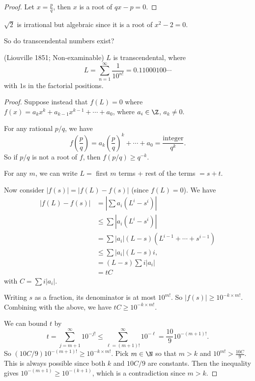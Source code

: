 \documentclass[a4paper]{article}
\begin{document}
  \begin{proof}
    Let $x = \frac{p}{q}$, then $x$ is a root of $qx - p = 0$.
  \end{proof}

  \begin{eg}
    $\sqrt{2}$ is irrational but algebraic since it is a root of $x^2 - 2 = 0$.
  \end{eg}

  So do transcendental numbers exist?
  \begin{thm}
    (Liouville 1851; Non-examinable) $L$ is transcendental, where
    \[
      L = \sum_{n = 1}^\infty \frac{1}{10^{n!}} = 0.11000100\cdots
    \]
    with $1$s in the factorial positions.
  \end{thm}

  \begin{proof}
    Suppose instead that $f(L) = 0$ where $f(x) = a_kx^k + a_{k -1}x^{k - 1} + \cdots + a_0$, where $a_i\in \Z$, $a_k\not= 0$.

    For any rational $p/q$, we have
    \[
      f\left(\frac{p}{q}\right) = a_k\left(\frac{p}{q}\right)^k + \cdots + a_0 = \frac{\text{integer}}{q^k}.
    \]
    So if $p/q$ is not a root of $f$, then $f(p/q) \geq q^{-k}$.

    For any $m$, we can write $L = $ first $m$ terms + rest of the terms $ = s + t$.

    Now consider $|f(s)| = |f(L) - f(s)|$ (since $f(L) = 0$). We have
    \begin{align*}
      |f(L) - f(s)| &= \left|\sum a_i(L^i - s^i)\right|\\
      &\leq \sum |a_i(L^i - s^i)|\\
      &= \sum |a_i|(L - s)(L^{i - 1} + \cdots + s^{i - 1})\\
      &\leq \sum |a_i|(L - s)i,\\
      &= (L - s)\sum i|a_i|\\
      &= tC
    \end{align*}
    with $C = \sum i|a_i|$.

    Writing $s$ as a fraction, its denominator is at most $10^{m!}$. So $|f(s)| \geq 10^{-k\times m!}$. Combining with the above, we have $tC \geq 10^{-k\times m!}$.

    We can bound $t$ by
    \[
      t = \sum_{j = m + 1}^\infty 10^{-j!} \leq \sum_{\ell = (m + 1)!}^\infty 10^{-\ell} = \frac{10}{9}10^{-(m + 1)!}.
    \]
    So $(10C/9)10^{-(m + 1)!} \geq 10^{-k\times m!}$. Pick $m\in \N$ so that $m > k$ and $10^{m!} > \frac{10C}{9}$. This is always possible since both $k$ and $10C/9$ are constants. Then the inequality gives $10^{-(m + 1)} \geq 10^{-(k + 1)}$, which is a contradiction since $m > k$.
  \end{proof}
\end{document}
